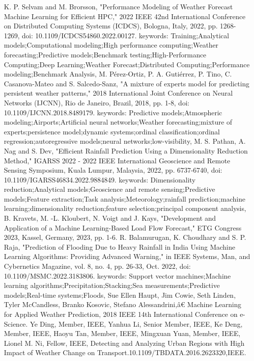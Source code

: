 \documentclass[conference]{IEEEtran}
\begin{document}
\begin{thebibliography}{00}
 K. P. Selvam and M. Brorsson, "Performance Modeling of Weather Forecast Machine Learning for Efficient HPC," 2022 IEEE 42nd International Conference on Distributed Computing Systems (ICDCS), Bologna, Italy, 2022, pp. 1268-1269, doi: 10.1109/ICDCS54860.2022.00127. keywords: {Training;Analytical models;Computational modeling;High performance computing;Weather forecasting;Predictive models;Benchmark testing;High-Performance Computing;Deep Learning;Weather Forecast;Distributed Computing;Performance modeling;Benchmark Analysis},
 M. Pérez-Ortiz, P. A. Gutiérrez, P. Tino, C. Casanova-Mateo and S. Salcedo-Sanz, "A mixture of experts model for predicting persistent weather patterns," 2018 International Joint Conference on Neural Networks (IJCNN), Rio de Janeiro, Brazil, 2018, pp. 1-8, doi: 10.1109/IJCNN.2018.8489179. keywords: {Predictive models;Atmospheric modeling;Airports;Artificial neural networks;Weather forecasting;mixture of experts;persistence model;dynamic systems;ordinal classification;ordinal regression;autoregressive models;neural networks;low-visibility},
 M. S. Pathan, A. Nag and S. Dev, "Efficient Rainfall Prediction Using a Dimensionality Reduction Method," IGARSS 2022 - 2022 IEEE International Geoscience and Remote Sensing Symposium, Kuala Lumpur, Malaysia, 2022, pp. 6737-6740, doi: 10.1109/IGARSS46834.2022.9884849. keywords: {Dimensionality reduction;Analytical models;Geoscience and remote sensing;Predictive models;Feature extraction;Task analysis;Meteorology;rainfall prediction;machine learning;dimensionality reduction;feature selection;principal component analysis},
 B. Kravets, M. -L. Kloubert, N. Voigt and J. Kays, "Development and Application of a Machine Learning-Based Load Flow Forecast," ETG Congress 2023, Kassel, Germany, 2023, pp. 1-6.
 R. Balamurugan, K. Choudhary and S. P. Raja, "Prediction of Flooding Due to Heavy Rainfall in India Using Machine Learning Algorithms: Providing Advanced Warning," in IEEE Systems, Man, and Cybernetics Magazine, vol. 8, no. 4, pp. 26-33, Oct. 2022, doi: 10.1109/MSMC.2022.3183806. keywords: {Support vector machines;Machine learning algorithms;Precipitation;Stacking;Sea measurements;Predictive models;Real-time systems;Floods},
 Sue Ellen Haupt, Jim Cowie, Seth Linden, Tyler McCandless, Branko Kosovic, Stefano Alessandrini,â€ Machine Learning for Applied Weather Prediction, 2018 IEEE 14th International Conference on e-Science.
 Ye Ding, Member, IEEE, Yanhua Li, Senior Member, IEEE, Ke Deng, Member, IEEE, Haoyu Tan, Member, IEEE, Mingxuan Yuan, Member, IEEE, Lionel M. Ni, Fellow, IEEE, Detecting and Analyzing Urban Regions with High Impact of Weather Change on Transport.10.1109/TBDATA.2016.2623320,IEEE.

\end{thebibliography}
\end{document}
